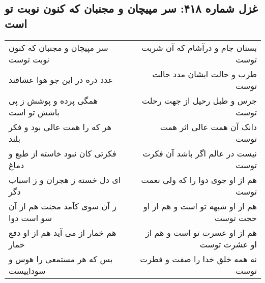 \begin{center}
\section*{غزل شماره ۴۱۸: سر مپیچان و مجنبان که کنون نوبت تو است}
\label{sec:0418}
\begin{longtable}{l p{0.5cm} r}
سر مپیچان و مجنبان که کنون نوبت توست
&&
بستان جام و درآشام که آن شربت توست
\\
عدد ذره در این جو هوا عشاقند
&&
طرب و حالت ایشان مدد حالت توست
\\
همگی پرده و پوشش ز پی باشش تو است
&&
جرس و طبل رحیل از جهت رحلت توست
\\
هر که را همت عالی بود و فکر بلند
&&
دانک آن همت عالی اثر همت توست
\\
فکرتی کان نبود خاسته از طبع و دماغ
&&
نیست در عالم اگر باشد آن فکرت توست
\\
ای دل خسته ز هجران و ز اسباب دگر
&&
هم از او جوی دوا را که ولی نعمت توست
\\
ز آن سوی کآمد محنت هم از آن سو است دوا
&&
هم از او شبهه تو است و هم از او حجت توست
\\
هم خمار از می آید هم از او دفع خمار
&&
هم از او عسرت تو است و هم از او عشرت توست
\\
بس که هر مستمعی را هوس و سوداییست
&&
نه همه خلق خدا را صفت و فطرت توست
\\
\end{longtable}
\end{center}
